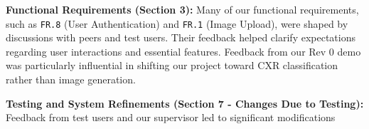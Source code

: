 \documentclass[12pt, titlepage]{article}
\begin{document}
\begin{enumerate}
  \textbf{Functional Requirements (Section 3):} Many of our functional requirements, such as \texttt{FR.8} (User Authentication) and \texttt{FR.1} (Image Upload), were shaped by discussions with peers and test users. Their feedback helped clarify expectations regarding user interactions and essential features. Feedback from our Rev 0 demo was particularly influential in shifting our project toward CXR classification rather than image generation.
  
  \textbf{Testing and System Refinements (Section 7 - Changes Due to Testing):} Feedback from test users and our supervisor led to significant modifications 
  
  

\end{enumerate}
\end{document}
